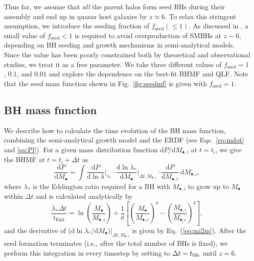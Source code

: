 \documentclass[twocolumn, twocolappendix]{aastex63}
\newcommand{\fseed}{f_\mathrm{seed}}
\newcommand{\tEdd}{t_\mathrm{Edd}}
\newcommand{\D}{\mathrm{d}}
\begin{document}
\begin{CJK*}{UTF8}{gbsn}
Thus far, we assume that {\it all} the parent halos form seed BHs during their assembly and end up in quasar host galaxies by $z\simeq 6$.
To relax this stringent assumption, we introduce the seeding fraction of $\fseed (\leq 1)$.
As discussed in \citet{2009ApJ...696.1798T}, a small value of $\fseed <1$ is required to avoid overproduction of SMBHs at $z\sim 6$,
depending on BH seeding and growth mechanisms in semi-analytical models.
Since the value has been poorly constrained both by theoretical and observational studies, we treat it as a free parameter.
We take three different values of $\fseed = 1$, $0.1$, and $0.01$ and explore the dependence on the best-fit BHMF and QLF.
Note that the seed mass function shown in Fig.~\ref{fig:seedmf} is given with $\fseed = 1$.



\subsection{BH mass function}\label{sec:MF}

We describe how to calculate the time evolution of the BH mass function, combining the semi-analytical growth model 
and the ERDF (see Eqs.~\ref{eq:mdot} and \ref{eq:Pl}).
For a given mass distribution function $\D P/\D  M_{\bullet, i}$ at $t=t_i$, we give the BHMF at $t=t_i+\Delta t$ as
\begin{equation}
  \label{eq:dpdm}
  \frac{\D P}{\D M_\bullet} = \int
   \frac{\D P}{\D \ln \lambda}\Big|_{\lambda_\ast} \cdot
   \frac{\D \ln \lambda_\ast}{\D  M_\bullet}\Big|_{\Delta t, M_{\bullet,i}} \cdot
  \frac{\D P}{\D M_{\bullet, i}}~\D M_{\bullet, i},
\end{equation}
%
where $\lambda_\ast$ is the Eddington ratio required for a BH with $M_{\bullet,i}$ to grow up to $M_{\bullet}$ within $\Delta t$
and is calculated analytically by
\begin{equation}
  \label{eq:mi2m}
\frac{\lambda_\ast \Delta t}{\tEdd}=
  \ln \left(\frac{M_\bullet} {M_{\bullet,i}}\right) + \frac{1}{\delta} 
  \left[ \left(\frac{M_\bullet}{M_{\bullet,c}}\right)^\delta - \left(\frac{M_{\bullet, i}}{M_{\bullet,c}}\right)^\delta \right],
\end{equation}
%
and the derivative of ($\D \ln \lambda_\ast / \D  M_\bullet )|_{\Delta t, M_{\bullet,i}}$ is given by Eq.~(\ref{eq:mi2m}).
After the seed formation terminates (i.e., after the total number of BHs is fixed), we perform this integration in every timestep 
by setting to $\Delta t = t_{\rm life}$ until $z=6$.







\end{CJK*}
\end{document}
